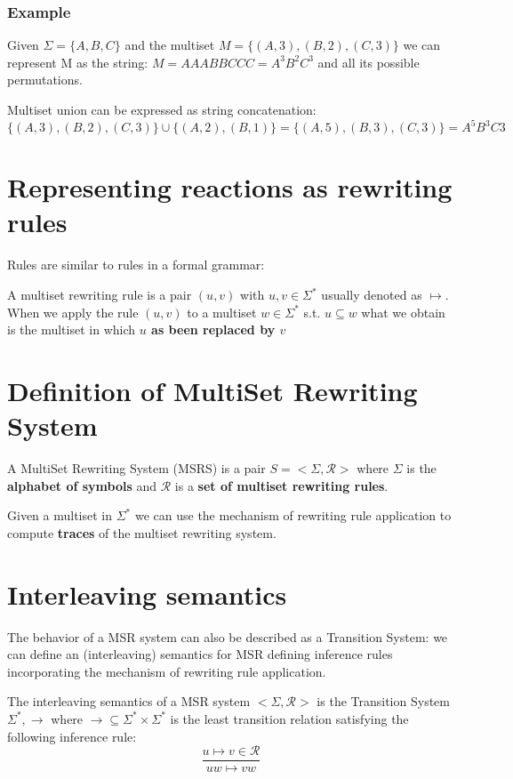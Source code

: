 \subsubsection{Example}
Given $\Sigma = \{A, B, C\}$ and the multiset $M = \{(A, 3), (B,2), (C,3)\}$ we can represent M as the string:
$M = AAABBCCC = A^{3}B^{2}C^{3}$ and all its possible permutations.\par
Multiset union can be expressed as string concatenation:
\begin{equation*}
\{(A,3), (B,2), (C,3) \} \cup \{ (A,2), (B,1)\} = \{(A,5), (B,3), (C,3)\} = A^{5}B^{3}C{3}    
\end{equation*}

\section{Representing reactions as rewriting rules}
Rules are similar to rules in a formal grammar:\par
A multiset rewriting rule is a pair $(u, v)$ with $u, v \in \Sigma^{*}$ usually denoted as $\mapsto$. When we apply the rule $(u,v)$ to a multiset $w \in \Sigma^{*}$ s.t. $u \subseteq w$ what we obtain is the multiset in which \textbf{$u$ as been replaced by $v$}

\section{Definition of MultiSet Rewriting System}
A MultiSet Rewriting System (MSRS) is a pair $S = < \Sigma, \mathcal{R} >$ where $\Sigma$ is the \textbf{alphabet of symbols} and  $\mathcal{R}$ is a \textbf{set of multiset rewriting rules}.\par
Given a multiset in $\Sigma^{*}$ we can use the mechanism of rewriting rule application to compute \textbf{traces} of the multiset rewriting system.

\section{Interleaving semantics}
The behavior of a MSR system can also be described as a Transition System: we can define an (interleaving) semantics for MSR defining inference rules incorporating the mechanism of rewriting rule application.\par
The interleaving semantics of a MSR system $< \Sigma, \mathcal{R}>$ is the Transition System ${\Sigma^{*}, \rightarrow}$ where $\rightarrow \subseteq \Sigma^{*} \times \Sigma^{*}$ is the least transition relation satisfying the following inference rule:
\begin{equation*}
    \frac{u \mapsto v \in \mathcal{R}}{uw \mapsto vw}
\end{equation*}

